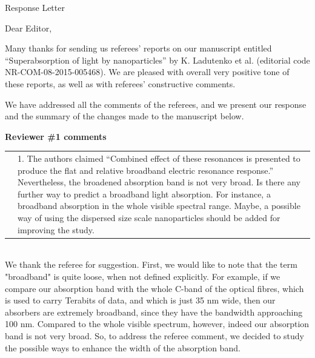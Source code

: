 \documentclass[a4paper]{article}
\begin{document}
\begin{center}
  Response Letter
\end{center}
Dear Editor,

Many thanks for sending us referees’ reports on our manuscript
entitled “Superabsorption of light by nanoparticles” by K. Ladutenko
et al. (editorial code NR-COM-08-2015-005468). We are pleased with
overall very positive tone of these reports, as well as with referees’
constructive comments.

We have addressed all the comments of the referees, and we present our
response and the summary of the changes made to the manuscript below.

\vspace{10pt}

\newpage
\textbf{Reviewer \#1 comments}

\begin{tabular}[!H]{l|p{}}
\quad & 1. The authors claimed “Combined effect of these resonances is
presented to produce the flat and relative broadband electric
resonance response.” Nevertheless, the broadened absorption band is
not very broad. Is there any further way to predict a broadband light
absorption. For instance, a broadband absorption in the whole visible
spectral range. Maybe, a possible way of using the dispersed size
scale nanoparticles should be added for improving the study.
\end{tabular}\\

We thank the referee for suggestion. First, we would like to note that
the term "broadband" is quite loose, when not defined explicitly. For
example, if we compare our absorption band with the whole C-band of
the optical fibres, which is used to carry Terabits of data, and which
is just 35 nm wide, then our absorbers are extremely broadband, since
they have the bandwidth approaching 100 nm. Compared to the whole
visible spectrum, however, indeed our absorption band is not very
broad. So, to address the referee comment, we decided to study the
possible ways to enhance the width of the absorption band.
\end{document}
